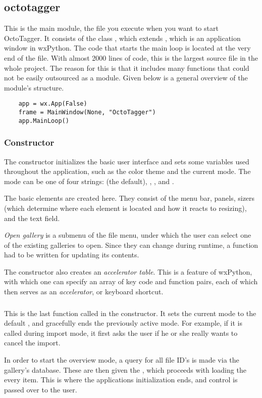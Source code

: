 \subsection{octotagger}
\def\kapitelautor{Erik Ritschl}

This is the main module, the file you execute when you want to start
OctoTagger. It consists of the class , which extends
, which is an application window in wxPython.
The code that starts the main loop is located at the very end of the file. %
With almost 2000 lines of code, this is the largest source file in the whole
project. The reason for this is that it includes many functions that could not
be easily outsourced as a module. Given below is a general overview of the
module's structure.

\begin{verbatim}
	app = wx.App(False)
	frame = MainWindow(None, "OctoTagger")
	app.MainLoop()
\end{verbatim}

\subsubsection{Constructor}

The constructor initializes the basic user interface and sets some variables
used throughout the application, such as the color theme and the current mode.
The mode can be one of four strings:  (the default),
, , and .

The basic elements are created here. They consist of the menu bar, panels,
sizers (which determine where each element is located and how it reacts to
resizing), and the text field. %

\emph{Open gallery} is a submenu of the file menu, under which the user can
select one of the existing galleries to open. Since they can change during
runtime, a function had to be written for updating its contents.

The constructor also creates an \emph{accelerator table}. This is a feature
of wxPython, with which one can specify an array of key code
and function pairs, each of which then serves as an \emph{accelerator}, or
keyboard shortcut.

\subsubsection{}

This is the last function called in the constructor. It sets the current mode
to the default , and gracefully ends the previously active
mode. For example, if it is called during import mode, it first asks the user
if he or she really wants to cancel the import.

In order to start the overview mode, a query for all file ID's is made via the
gallery's database. These are then given the , which proceeds
with loading the every item. This is where the applications initialization
ends, and control is passed over to the user.
